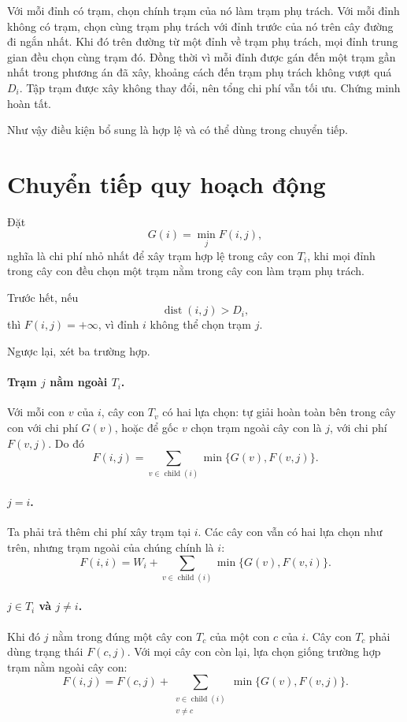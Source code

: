 \documentclass[11pt]{article}
\begin{document}
Với mỗi đỉnh có trạm, chọn chính trạm của nó làm trạm phụ trách. Với mỗi đỉnh
không có trạm, chọn cùng trạm phụ trách với đỉnh trước của nó trên cây đường
đi ngắn nhất. Khi đó trên đường từ một đỉnh về trạm phụ trách, mọi đỉnh trung
gian đều chọn cùng trạm đó. Đồng thời vì mỗi đỉnh được gán đến một trạm gần
nhất trong phương án đã xây, khoảng cách đến trạm phụ trách không vượt quá
\(D_i\). Tập trạm được xây không thay đổi, nên tổng chi phí vẫn tối ưu.
Chứng minh hoàn tất.

Như vậy điều kiện bổ sung là hợp lệ và có thể dùng trong chuyển tiếp.

\section{Chuyển tiếp quy hoạch động}

Đặt
\[
  G(i)=\min_{j} F(i,j),
\]
nghĩa là chi phí nhỏ nhất để xây trạm hợp lệ trong cây con \(T_i\), khi mọi
đỉnh trong cây con đều chọn một trạm nằm trong cây con làm trạm phụ trách.

Trước hết, nếu
\[
  \operatorname{dist}(i,j)>D_i,
\]
thì \(F(i,j)=+\infty\), vì đỉnh \(i\) không thể chọn trạm \(j\).

Ngược lại, xét ba trường hợp.

\paragraph{Trạm \(j\) nằm ngoài \(T_i\).}
Với mỗi con \(v\) của \(i\), cây con \(T_v\) có hai lựa chọn: tự giải hoàn
toàn bên trong cây con với chi phí \(G(v)\), hoặc để gốc \(v\) chọn trạm ngoài
cây con là \(j\), với chi phí \(F(v,j)\). Do đó
\[
  F(i,j)=\sum_{v\in\operatorname{child}(i)}
  \min\{G(v),F(v,j)\}.
\]

\paragraph{\(j=i\).}
Ta phải trả thêm chi phí xây trạm tại \(i\). Các cây con vẫn có hai lựa chọn
như trên, nhưng trạm ngoài của chúng chính là \(i\):
\[
  F(i,i)=W_i+\sum_{v\in\operatorname{child}(i)}
  \min\{G(v),F(v,i)\}.
\]

\paragraph{\(j\in T_i\) và \(j\ne i\).}
Khi đó \(j\) nằm trong đúng một cây con \(T_c\) của một con \(c\) của \(i\).
Cây con \(T_c\) phải dùng trạng thái \(F(c,j)\). Với mọi cây con còn lại,
lựa chọn giống trường hợp trạm nằm ngoài cây con:
\[
  F(i,j)=F(c,j)+
  \sum_{\substack{v\in\operatorname{child}(i)\\v\ne c}}
  \min\{G(v),F(v,j)\}.
\]
\end{document}
